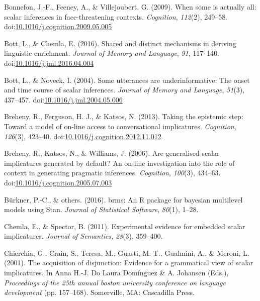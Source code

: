 \documentclass[man]{apa6}
\theoremstyle{definition}
\theoremstyle{definition}
\theoremstyle{definition}
\theoremstyle{remark}
\begin{document}
\hypertarget{ref-Bonnefon2009}{}
Bonnefon, J.-F., Feeney, A., \& Villejoubert, G. (2009). When some is
actually all: scalar inferences in face-threatening contexts.
\emph{Cognition}, \emph{112}(2), 249--58.
doi:\href{https://doi.org/10.1016/j.cognition.2009.05.005}{10.1016/j.cognition.2009.05.005}

\hypertarget{ref-Bott2016}{}
Bott, L., \& Chemla, E. (2016). Shared and distinct mechanisms in
deriving linguistic enrichment. \emph{Journal of Memory and Language},
\emph{91}, 117--140.
doi:\href{https://doi.org/10.1016/j.jml.2016.04.004}{10.1016/j.jml.2016.04.004}

\hypertarget{ref-Bott2004}{}
Bott, L., \& Noveck, I. (2004). Some utterances are underinformative:
The onset and time course of scalar inferences. \emph{Journal of Memory
and Language}, \emph{51}(3), 437--457.
doi:\href{https://doi.org/10.1016/j.jml.2004.05.006}{10.1016/j.jml.2004.05.006}

\hypertarget{ref-Breheny2013}{}
Breheny, R., Ferguson, H. J., \& Katsos, N. (2013). Taking the epistemic
step: Toward a model of on-line access to conversational implicatures.
\emph{Cognition}, \emph{126}(3), 423--40.
doi:\href{https://doi.org/10.1016/j.cognition.2012.11.012}{10.1016/j.cognition.2012.11.012}

\hypertarget{ref-Breheny2006}{}
Breheny, R., Katsos, N., \& Williams, J. (2006). Are generalised scalar
implicatures generated by default? An on-line investigation into the
role of context in generating pragmatic inferences. \emph{Cognition},
\emph{100}(3), 434--63.
doi:\href{https://doi.org/10.1016/j.cognition.2005.07.003}{10.1016/j.cognition.2005.07.003}

\hypertarget{ref-burkner2016brms}{}
Bürkner, P.-C., \& others. (2016). brms: An R package for bayesian
multilevel models using Stan. \emph{Journal of Statistical Software},
\emph{80}(1), 1--28.

\hypertarget{ref-Chemla2011}{}
Chemla, E., \& Spector, B. (2011). Experimental evidence for embedded
scalar implicatures. \emph{Journal of Semantics}, \emph{28}(3),
359--400.

\hypertarget{ref-chierchia2001}{}
Chierchia, G., Crain, S., Teresa, M., Guasti, M. T., Gualmini, A., \&
Meroni, L. (2001). The acquisition of disjunction: Evidence for a
grammatical view of scalar implicatures. In Anna H.-J. Do Laura
Domínguez \& A. Johansen (Eds.), \emph{Proceedings of the 25th annual
boston university conference on language development} (pp. 157--168).
Somerville, MA: Cascadilla Press.
\end{document}
